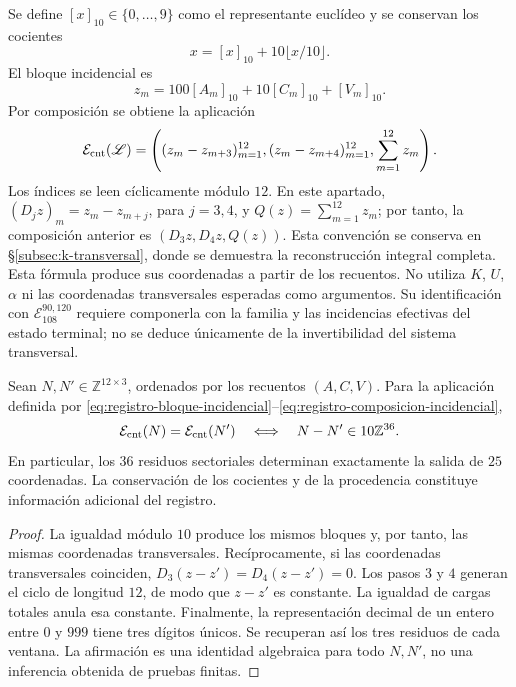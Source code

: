 Se define \([x]_{10}\in\{0,\ldots,9\}\) como el representante
euclídeo y se conservan los cocientes
\[
 x=[x]_{10}+10\lfloor x/10\rfloor.
\]
El bloque incidencial es
\begin{equation}
 z_m=100[A_m]_{10}+10[C_m]_{10}+[V_m]_{10}.
 \label{eq:registro-bloque-incidencial}
\end{equation}
Por composición se obtiene la aplicación
\begin{equation}
 \mathcal E_{\rm cnt}(\mathscr L)=
 \left((z_m-z_{m+3})_{m=1}^{12},
       (z_m-z_{m+4})_{m=1}^{12},\sum_{m=1}^{12}z_m\right).
\label{eq:registro-composicion-incidencial}
\end{equation}
Los índices se leen cíclicamente módulo \(12\). En este apartado,
\((D_jz)_m=z_m-z_{m+j}\), para \(j=3,4\), y
\(Q(z)=\sum_{m=1}^{12}z_m\); por tanto, la composición anterior es
\((D_3z,D_4z,Q(z))\). Esta convención se conserva en
\S\ref{subsec:k-transversal}, donde se demuestra la reconstrucción
integral completa.
Esta fórmula produce sus coordenadas a partir de los recuentos. No utiliza
\(K\), \(U\), \(\alpha\) ni las coordenadas transversales esperadas
como argumentos. Su identificación con
\(\mathcal E_{108}^{90,120}\) requiere componerla con la familia y
las incidencias efectivas del estado terminal; no se deduce únicamente
de la invertibilidad del sistema transversal.

\begin{proposition}
\label{prop:registro-36-residuos}
Sean \(N,N'\in\mathbb Z^{12\times3}\), ordenados por los recuentos
\((A,C,V)\). Para la aplicación definida por
\eqref{eq:registro-bloque-incidencial}--\eqref{eq:registro-composicion-incidencial},
\[
 \mathcal E_{\rm cnt}(N)=\mathcal E_{\rm cnt}(N')
 \quad\Longleftrightarrow\quad
 N-N'\in10\mathbb Z^{36}.
\]
En particular, los \(36\) residuos sectoriales determinan exactamente
la salida de \(25\) coordenadas. La conservación de los cocientes y
de la procedencia constituye información adicional del registro.
\end{proposition}

\begin{proof}
La igualdad módulo \(10\) produce los mismos bloques y, por tanto,
las mismas coordenadas transversales. Recíprocamente, si las coordenadas
transversales coinciden, \(D_3(z-z')=D_4(z-z')=0\). Los pasos
\(3\) y \(4\) generan el ciclo de longitud \(12\), de modo que
\(z-z'\) es constante. La igualdad de cargas totales anula esa
constante. Finalmente, la representación decimal de un entero entre
\(0\) y \(999\) tiene tres dígitos únicos. Se recuperan así los
tres residuos de cada ventana. La afirmación es una identidad algebraica
para todo \(N,N'\), no una inferencia obtenida de pruebas finitas.
\end{proof}

